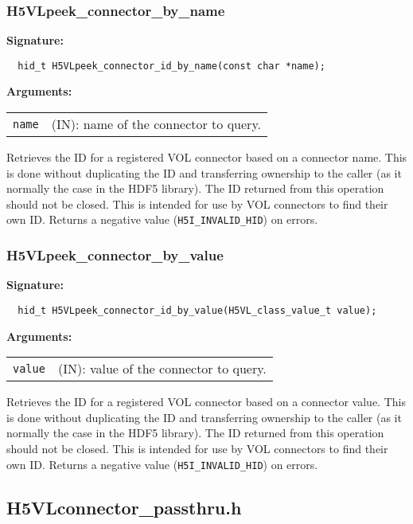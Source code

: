 \subsubsection{H5VLpeek\_connector\_by\_name}
\begin{mdframed}[style=bgbox]
\textbf{Signature:}
\begin{lstlisting}
  hid_t H5VLpeek_connector_id_by_name(const char *name); 
\end{lstlisting}
\textbf{Arguments:}\\
\begin{tabular}{l p{13.5cm}}
 {\tt name} & (IN): name of the connector to query.\\
\end{tabular}
\end{mdframed}
Retrieves the ID for a registered VOL connector based on a connector name.
This is done without duplicating
the ID and transferring ownership to the caller (as it normally the case in the
HDF5 library). The ID returned from this operation should not be closed.
This is intended for use by VOL connectors to find their own ID.
Returns a negative value ({\tt H5I\_INVALID\_HID}) on errors.
\bigskip


\subsubsection{H5VLpeek\_connector\_by\_value}
\begin{mdframed}[style=bgbox]
\textbf{Signature:}
\begin{lstlisting}
  hid_t H5VLpeek_connector_id_by_value(H5VL_class_value_t value); 
\end{lstlisting}
\textbf{Arguments:}\\
\begin{tabular}{l p{13.5cm}}
 {\tt value} & (IN): value of the connector to query.\\
\end{tabular}
\end{mdframed}
Retrieves the ID for a registered VOL connector based on a connector value.
This is done without duplicating
the ID and transferring ownership to the caller (as it normally the case in the
HDF5 library). The ID returned from this operation should not be closed.
This is intended for use by VOL connectors to find their own ID.
Returns a negative value ({\tt H5I\_INVALID\_HID}) on errors.
\bigskip


\subsection{H5VLconnector\_passthru.h}

